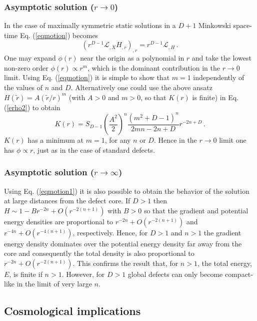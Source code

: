 \documentclass[prd,twocolumn,a4paper,superscriptaddress,floatfix]{revtex4}
\def\be{\begin{equation}}
\def\ee{\end{equation}}
\begin{document}
\subsubsection{\rm Asymptotic solution ($r \to 0$)}

In the case of maximally symmetric static solutions in a $D+1$ Minkowski space-time Eq.  (\ref{eqmotion}) becomes
\be
\label{eqmotion1}
(r^{D-1}\mathcal{L}_{,X}H_{,r})_{,r}=r^{D-1}\mathcal{L}_{,H}\,.
\ee
One may expand $\phi(r)$ near the origin as a polynomial in $r$ and take the lowest non-zero order $\phi(r) \propto r^m$, which is the dominant contribution in the $r \to 0$ limit. Using Eq.  (\ref{eqmotion}) it is simple to show that $m=1$ independently of the values of $n$ and $D$. Alternatively one could use the above ansatz $H({\tilde r})=A ({\tilde r}/r)^m$ (with $A>0$ and $m>0$, so that $K(r)$ is finite) in Eq.  (\ref{erho2}) to obtain
\be
K(r)=S_{D-1}\left(\frac{A^2}{2}\right)^n\frac{(m^2+D-1)^n}{2mn-2n+D} r^{-2n+D}\,.
\ee
$K(r)$ has a minimum at $m=1$, for any $n$ or $D$. Hence in the $r \to 0$ limit one has $\phi \propto r$, just as in the case of standard defects. 

\subsubsection{\rm Asymptotic solution ($r \to \infty$)}

Using Eq. (\ref{eqmotion1}) it is also possible to obtain the behavior of the solution at large distances from the defect core. If $D>1$ then $H \sim 1 - Br^{-2n}+O(r^{-2(n+1)})$ with $B>0$ so that the gradient and potential energy densities are proportional to $r^{-2n}+O(r^{-2(n+1)})$ and $r^{-4n}+O(r^{-4(n+1)})$, respectively. Hence, for $D>1$ and $n>1$ the gradient energy density dominates over the potential energy density far away from the core and consequently the total density  is also proportional to $r^{-2n}+O(r^{-2(n+1)})$. This confirms the result that, for $n >1$, the total energy, $E$, is finite if $n>1$. However, for $D>1$ global defects can only become compact-like in the limit of very large $n$. 

\subsection{Cosmological implications}
\end{document}
